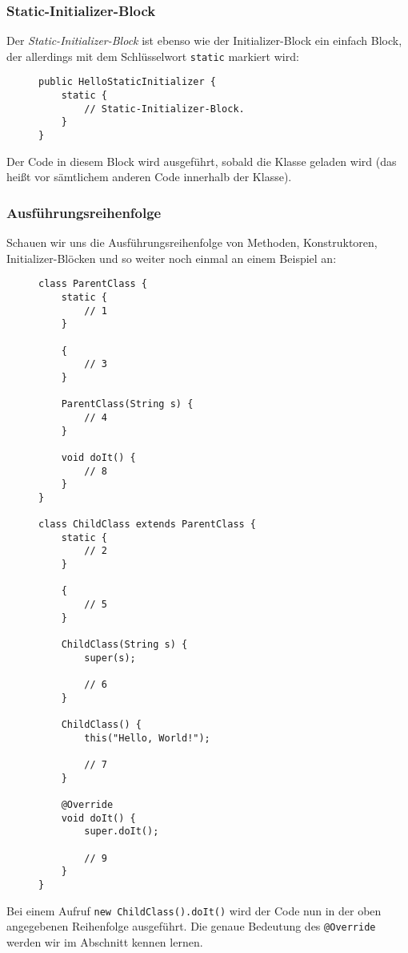 	\subsubsection{Static-Initializer-Block}
		Der \textit{Static-Initializer-Block} ist ebenso wie der Initializer-Block ein einfach Block, der allerdings mit dem Schlüsselwort \lstinline|static| markiert wird:
		\begin{figure}[H]
			\centering
			\begin{lstlisting}
public HelloStaticInitializer {
	static {
		// Static-Initializer-Block.
	}
}
\end{lstlisting}
\end{figure}
		Der Code in diesem Block wird ausgeführt, sobald die Klasse geladen wird (das heißt vor sämtlichem anderen Code innerhalb der Klasse).
	
	\subsubsection{Ausführungsreihenfolge}
		Schauen wir uns die Ausführungsreihenfolge von Methoden, Konstruktoren, Initializer-Blöcken und so weiter noch einmal an einem Beispiel an:
		\begin{figure}[H]
			\centering
			\begin{lstlisting}
class ParentClass {
	static {
		// 1
	}
	
	{
		// 3
	}
	
	ParentClass(String s) {
		// 4
	}
	
	void doIt() {
		// 8
	}
}

class ChildClass extends ParentClass {
	static {
		// 2
	}
	
	{
		// 5
	}
	
	ChildClass(String s) {
		super(s);
		
		// 6
	}
	
	ChildClass() {
		this("Hello, World!");
		
		// 7
	}
	
	@Override
	void doIt() {
		super.doIt();
		
		// 9
	}
}
\end{lstlisting}
		\end{figure}
		Bei einem Aufruf \lstinline|new ChildClass().doIt()| wird der Code nun in der oben angegebenen Reihenfolge ausgeführt. Die genaue Bedeutung des \lstinline|@Override| werden wir im Abschnitt  kennen lernen.

